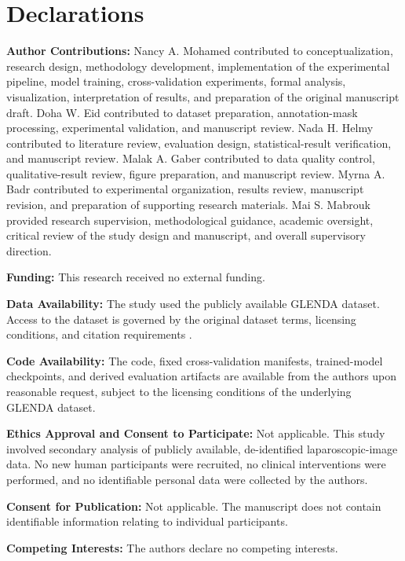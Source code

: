 \FloatBarrier
\section*{Declarations}

\noindent\textbf{Author Contributions:} Nancy A. Mohamed contributed to conceptualization, research design, methodology development, implementation of the experimental pipeline, model training, cross-validation experiments, formal analysis, visualization, interpretation of results, and preparation of the original manuscript draft. Doha W. Eid contributed to dataset preparation, annotation-mask processing, experimental validation, and manuscript review. Nada H. Helmy contributed to literature review, evaluation design, statistical-result verification, and manuscript review. Malak A. Gaber contributed to data quality control, qualitative-result review, figure preparation, and manuscript review. Myrna A. Badr contributed to experimental organization, results review, manuscript revision, and preparation of supporting research materials. Mai S. Mabrouk provided research supervision, methodological guidance, academic oversight, critical review of the study design and manuscript, and overall supervisory direction.

\vspace{0.4em}
\noindent\textbf{Funding:} This research received no external funding.

\vspace{0.4em}
\noindent\textbf{Data Availability:} The study used the publicly available GLENDA dataset. Access to the dataset is governed by the original dataset terms, licensing conditions, and citation requirements \cite{leibetseder2020glenda}.

\vspace{0.4em}
\noindent\textbf{Code Availability:} The code, fixed cross-validation manifests, trained-model checkpoints, and derived evaluation artifacts are available from the authors upon reasonable request, subject to the licensing conditions of the underlying GLENDA dataset.

\vspace{0.4em}
\noindent\textbf{Ethics Approval and Consent to Participate:} Not applicable. This study involved secondary analysis of publicly available, de-identified laparoscopic-image data. No new human participants were recruited, no clinical interventions were performed, and no identifiable personal data were collected by the authors.

\vspace{0.4em}
\noindent\textbf{Consent for Publication:} Not applicable. The manuscript does not contain identifiable information relating to individual participants.

\vspace{0.4em}
\noindent\textbf{Competing Interests:} The authors declare no competing interests.





